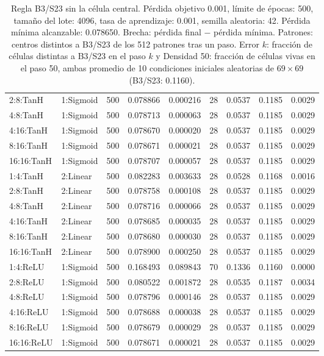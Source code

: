 \begin{table}[H]
\begin{tabular}{llrrrrrrr}
		2:8:TanH & 1:Sigmoid & 500 & 0.078866 & 0.000216 & 28 & 0.0537 & 0.1185 & 0.0029 \\
		4:8:TanH & 1:Sigmoid & 500 & 0.078713 & 0.000063 & 28 & 0.0537 & 0.1185 & 0.0029 \\
		4:16:TanH & 1:Sigmoid & 500 & 0.078670 & 0.000020 & 28 & 0.0537 & 0.1185 & 0.0029 \\
		8:16:TanH & 1:Sigmoid & 500 & 0.078671 & 0.000021 & 28 & 0.0537 & 0.1185 & 0.0029 \\
		16:16:TanH & 1:Sigmoid & 500 & 0.078707 & 0.000057 & 28 & 0.0537 & 0.1185 & 0.0029 \\
		\midrule
		1:4:TanH & 2:Linear & 500 & 0.082283 & 0.003633 & 28 & 0.0528 & 0.1168 & 0.0016 \\
		2:8:TanH & 2:Linear & 500 & 0.078758 & 0.000108 & 28 & 0.0537 & 0.1185 & 0.0029 \\
		4:8:TanH & 2:Linear & 500 & 0.078716 & 0.000066 & 28 & 0.0537 & 0.1185 & 0.0029 \\
		4:16:TanH & 2:Linear & 500 & 0.078685 & 0.000035 & 28 & 0.0537 & 0.1185 & 0.0029 \\
		8:16:TanH & 2:Linear & 500 & 0.078680 & 0.000030 & 28 & 0.0537 & 0.1185 & 0.0029 \\
		16:16:TanH & 2:Linear & 500 & 0.078900 & 0.000250 & 28 & 0.0537 & 0.1185 & 0.0029 \\
		\midrule
		1:4:ReLU & 1:Sigmoid & 500 & 0.168493 & 0.089843 & 70 & 0.1336 & 0.1160 & 0.0000 \\
		2:8:ReLU & 1:Sigmoid & 500 & 0.080522 & 0.001872 & 28 & 0.0535 & 0.1187 & 0.0034 \\
		4:8:ReLU & 1:Sigmoid & 500 & 0.078796 & 0.000146 & 28 & 0.0537 & 0.1185 & 0.0029 \\
		4:16:ReLU & 1:Sigmoid & 500 & 0.078688 & 0.000038 & 28 & 0.0537 & 0.1185 & 0.0029 \\
		8:16:ReLU & 1:Sigmoid & 500 & 0.078679 & 0.000029 & 28 & 0.0537 & 0.1185 & 0.0029 \\
		16:16:ReLU & 1:Sigmoid & 500 & 0.078671 & 0.000021 & 28 & 0.0537 & 0.1185 & 0.0029 \\
		\bottomrule
	\end{tabular}
	\caption{Regla B3/S23 sin la célula central. Pérdida objetivo 0.001, límite de épocas: 500, tamaño del lote: 4096, tasa de aprendizaje: 0.001, semilla aleatoria: 42. Pérdida mínima alcanzable: 0.078650. Brecha: pérdida final $-$ pérdida mínima. Patrones: centros distintos a B3/S23 de los 512 patrones tras un paso. Error $k$: fracción de células distintas a B3/S23 en el paso $k$ y Densidad 50: fracción de células vivas en el paso 50, ambas promedio de 10 condiciones iniciales aleatorias de $69\times69$ (B3/S23: 0.1160).}
	\label{tab:vecindad_centro}
\end{table}

